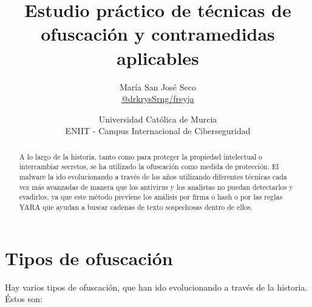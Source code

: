\documentclass[a4paper]{article}
\title{Estudio práctico de técnicas de ofuscación y contramedidas aplicables}
\author{María San José Seco \\ \href{https://github.com/drkrysSrng/freyja}{@drkrysSrng/freyja}}
\date{
	Universidad Católica de Murcia \\
	ENIIT - Campus Internacional de Ciberseguridad
}
\begin{document}
	\maketitle
	
	\begin{abstract}
		
	A lo largo de la historia, tanto como para proteger la propiedad intelectual o intercambiar secretos, se ha utilizado la ofuscación como medida de protección. El malware la ido evolucionando a través de los años utilizando diferentes técnicas cada vez más avanzadas de manera que los antivirus y los analistas no puedan detectarlos y evadirlos, ya que este método previene los análisis por firma o hash o por las reglas YARA que ayudan a buscar cadenas de texto sospechosas dentro de ellos. 
	\end{abstract}
	
	\section{Tipos de ofuscación}
	
	Hay varios tipos de ofuscación, que han ido evolucionando a través de la historia. Éstos son:
	
\end{document}
